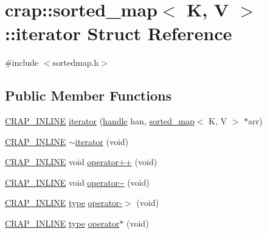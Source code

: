 \hypertarget{structcrap_1_1sorted__map_1_1iterator}{\section{crap\+:\+:sorted\+\_\+map$<$ K, V $>$\+:\+:iterator Struct Reference}
\label{structcrap_1_1sorted__map_1_1iterator}
}


{\ttfamily \#include $<$sortedmap.\+h$>$}

\subsection*{Public Member Functions}
\begin{DoxyCompactItemize}
\item 
\hyperlink{config__x86_8h_a5a40526b8d842e7ff731509998bb0f1c}{C\+R\+A\+P\+\_\+\+I\+N\+L\+I\+N\+E} \hyperlink{structcrap_1_1sorted__map_1_1iterator_a50dee691d1da8fe2e7fe48ad43f96561}{iterator} (\hyperlink{classcrap_1_1sorted__map_a741a562ba6e22dc1a20e103e75619189}{handle} han, \hyperlink{classcrap_1_1sorted__map}{sorted\+\_\+map}$<$ K, V $>$ $\ast$arr)
\item 
\hyperlink{config__x86_8h_a5a40526b8d842e7ff731509998bb0f1c}{C\+R\+A\+P\+\_\+\+I\+N\+L\+I\+N\+E} \hyperlink{structcrap_1_1sorted__map_1_1iterator_a8f97dcf1b4928f149916e7c7176b8182}{$\sim$iterator} (void)
\item 
\hyperlink{config__x86_8h_a5a40526b8d842e7ff731509998bb0f1c}{C\+R\+A\+P\+\_\+\+I\+N\+L\+I\+N\+E} void \hyperlink{structcrap_1_1sorted__map_1_1iterator_a549001766153d7602013e4dcef704a29}{operator++} (void)
\item 
\hyperlink{config__x86_8h_a5a40526b8d842e7ff731509998bb0f1c}{C\+R\+A\+P\+\_\+\+I\+N\+L\+I\+N\+E} void \hyperlink{structcrap_1_1sorted__map_1_1iterator_a1af0e9500ac8c91d1ecb4c4f378a915e}{operator-\/-\/} (void)
\item 
\hyperlink{config__x86_8h_a5a40526b8d842e7ff731509998bb0f1c}{C\+R\+A\+P\+\_\+\+I\+N\+L\+I\+N\+E} \hyperlink{classcrap_1_1sorted__map_a53d3509992e52b87de809a99bf246551}{type} \hyperlink{structcrap_1_1sorted__map_1_1iterator_a44b49842cbaeab07bfe04877a1228457}{operator-\/$>$} (void)
\item 
\hyperlink{config__x86_8h_a5a40526b8d842e7ff731509998bb0f1c}{C\+R\+A\+P\+\_\+\+I\+N\+L\+I\+N\+E} \hyperlink{classcrap_1_1sorted__map_a53d3509992e52b87de809a99bf246551}{type} \hyperlink{structcrap_1_1sorted__map_1_1iterator_af28775534a53adbe694d8faaeabe4b8e}{operator$\ast$} (void)

\end{DoxyCompactItemize}
